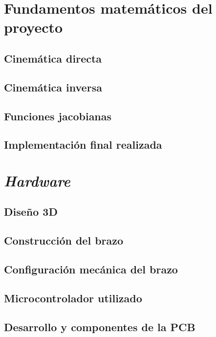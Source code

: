 \chapter{Fundamentos matemáticos del proyecto}
\label{chap:maths}

\section{Cinemática directa}

\section{Cinemática inversa}

\section{Funciones jacobianas}

\section{Implementación final realizada}


\chapter{\textit{Hardware}}
\label{chap:hardware}

\section{Diseño 3D}
\label{sec:3desing}

\section{Construcción del brazo}

\section{Configuración mecánica del brazo}

\section{Microcontrolador utilizado}

\section{Desarrollo y componentes de la PCB}

